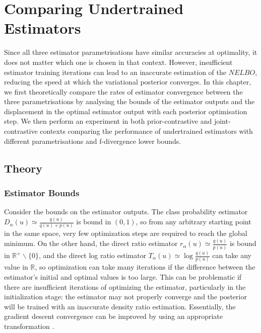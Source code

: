 \documentclass[honours,12pt]{unswthesis}
\newcommand{\R}{\mathbb{R}}
\numberwithin{equation}{section}
\theoremstyle{definition}
\begin{document}
\chapter{Comparing Undertrained Estimators}
Since all three estimator parametrisations have similar accuracies at optimality, it does not matter which one is chosen in that context. However, insufficient estimator training iterations can lead to an inaccurate estimation of the $NELBO$, reducing the speed at which the variational posterior converges. In this chapter, we first theoretically compare the rates of estimator convergence between the three parametrisations by analysing the bounds of the estimator outputs and the displacement in the optimal estimator output with each posterior optimisation step. We then perform an experiment in both prior-contrastive and joint-contrastive contexts comparing the performance of undertrained estimators with different parametrisations and f-divergence lower bounds.
\section{Theory}
\subsection{Estimator Bounds}
Consider the bounds on the estimator outputs. The class probability estimator $D_\alpha(u)\simeq \frac{q(u)}{q(u)+p(u)}$ is bound in $(0,1)$, so from any arbitrary starting point in the same space, very few optimization steps are required to reach the global minimum. On the other hand, the direct ratio estimator $r_\alpha(u)\simeq \frac{q(u)}{p(u)}$ is bound in $\R^+ \backslash \{0\}$, and the direct log ratio estimator $T_\alpha(u) \simeq \log \frac{q(u)}{p(u)}$ can take any value in $\R$, so optimization can take many iterations if the difference between the estimator's initial and optimal values is too large. This can be problematic if there are insufficient iterations of optimizing the estimator, particularly in the initialization stage: the estimator may not properly converge and the posterior will be trained with an inaccurate density ratio estimation. Essentially, the gradient descent convergence can be improved by using an appropriate transformation \citep{lecun}.
\end{document}
